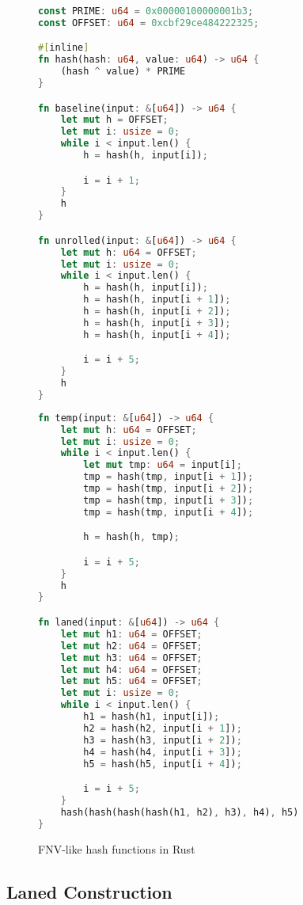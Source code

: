 \documentclass[11pt]{article}
\begin{document}
\begin{figure}[h]
    \begin{multicols}{2}
        \begin{lstlisting}[language=Rust, style=boxed]
const PRIME: u64 = 0x00000100000001b3;
const OFFSET: u64 = 0xcbf29ce484222325;

#[inline]
fn hash(hash: u64, value: u64) -> u64 {
    (hash ^ value) * PRIME
}

fn baseline(input: &[u64]) -> u64 {
    let mut h = OFFSET;
    let mut i: usize = 0;
    while i < input.len() {
        h = hash(h, input[i]);

        i = i + 1;
    }
    h
}

fn unrolled(input: &[u64]) -> u64 {
    let mut h: u64 = OFFSET;
    let mut i: usize = 0;
    while i < input.len() {
        h = hash(h, input[i]);
        h = hash(h, input[i + 1]);
        h = hash(h, input[i + 2]);
        h = hash(h, input[i + 3]);
        h = hash(h, input[i + 4]);

        i = i + 5;
    }
    h
}
        \end{lstlisting}
        \columnbreak
        \begin{lstlisting}[language=Rust, style=boxed]
fn temp(input: &[u64]) -> u64 {
    let mut h: u64 = OFFSET;
    let mut i: usize = 0;
    while i < input.len() {
        let mut tmp: u64 = input[i];
        tmp = hash(tmp, input[i + 1]);
        tmp = hash(tmp, input[i + 2]);
        tmp = hash(tmp, input[i + 3]);
        tmp = hash(tmp, input[i + 4]);

        h = hash(h, tmp);

        i = i + 5;
    }
    h
}

fn laned(input: &[u64]) -> u64 {
    let mut h1: u64 = OFFSET;
    let mut h2: u64 = OFFSET;
    let mut h3: u64 = OFFSET;
    let mut h4: u64 = OFFSET;
    let mut h5: u64 = OFFSET; 
    let mut i: usize = 0;
    while i < input.len() {
        h1 = hash(h1, input[i]);
        h2 = hash(h2, input[i + 1]);
        h3 = hash(h3, input[i + 2]);
        h4 = hash(h4, input[i + 3]);
        h5 = hash(h5, input[i + 4]);

        i = i + 5;
    }
    hash(hash(hash(hash(h1, h2), h3), h4), h5)
}
        \end{lstlisting}
    \end{multicols}
    \caption{FNV-like hash functions in Rust}
    \label{fig:ilp_rust_example}
\end{figure}

\subsection{Laned Construction}
\end{document}
